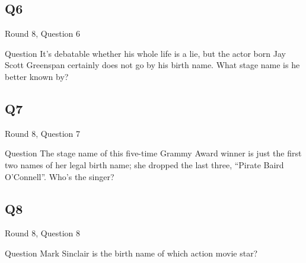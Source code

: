 \documentclass[11pt]{beamer}
\begin{document}
\subsection*{Q6}
\begin{frame}[t]{Round 8, Question 6}
\begin{block}{Question}
It's debatable whether his whole life is a lie, but the actor born Jay Scott Greenspan certainly does not go by his birth name. What stage name is he better known by?
\end{block}
\end{frame}
\subsection*{Q7}
\begin{frame}[t]{Round 8, Question 7}
\begin{block}{Question}
The stage name of this five-time Grammy Award winner is just the first two names of her legal birth name; she dropped the last three, ``Pirate Baird O'Connell''. Who's the singer?
\end{block}
\end{frame}
\subsection*{Q8}
\begin{frame}[t]{Round 8, Question 8}
\begin{block}{Question}
Mark Sinclair is the birth name of which action movie star?
\end{block}
\end{frame}
\end{document}
